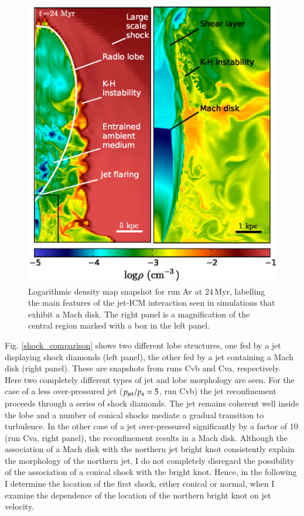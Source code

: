 \begin{figure}
\centering
\includegraphics[width=\linewidth]{pbm.eps}
\caption{Logarithmic density map snapshot for run Av at $24\,\mathrm{Myr}$, labelling the main features of the jet-ICM interaction seen in simulations that exhibit a Mach disk. The right panel is a magnification of the central region marked with a box in the left panel.}
\label{f:morph}
\end{figure}


Fig. \ref{shock_comparison} shows two different lobe structures, one fed by a jet displaying shock diamonds (left panel), the other fed by a jet containing a Mach disk (right panel). These are snapshots from runs Cvb and Cva, respectively. Here two completely different types of jet and lobe morphology are seen. For the case of a less over-pressured jet ($p_{\rm{jet}}/p_{\rm{a}}=5$, run Cvb) the jet reconfinement proceeds through a series of shock diamonds. The jet remains coherent well inside the lobe and a number of conical shocks mediate a gradual transition to turbulence. In the other case of a jet over-pressured significantly by a factor of 10 (run Cva, right panel), the reconfinement results in a Mach disk. Although the association of a Mach disk with the northern jet bright knot consistently explain the morphology of the northern jet, I do not completely disregard the possibility of the association of a conical shock with the bright knot. Hence, in the following I determine the location of the first shock, either conical or normal, when I examine the dependence of the location of the northern bright knot on jet velocity.

